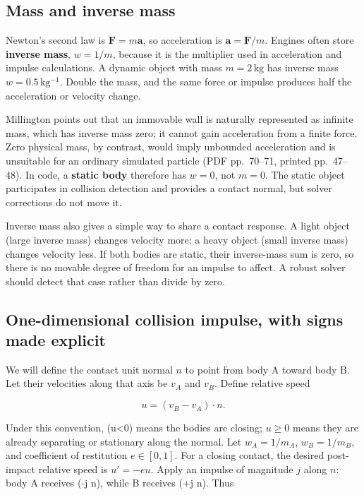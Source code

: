 \subsection{Mass and inverse mass}\label{06-engine-ii-ch033-mass-and-inverse-mass}

Newton's second law is \(\mathbf{F}=m\mathbf{a}\), so acceleration is \(\mathbf{a}=\mathbf{F}/m\). Engines often store \textbf{inverse mass}, \(w=1/m\), because it is the multiplier used in acceleration and impulse calculations. A dynamic object with mass \(m=2\,\mathrm{kg}\) has inverse mass \(w=0.5\,\mathrm{kg^{-1}}\). Double the mass, and the same force or impulse produces half the acceleration or velocity change.

Millington points out that an immovable wall is naturally represented as infinite mass, which has inverse mass zero; it cannot gain acceleration from a finite force. Zero physical mass, by contrast, would imply unbounded acceleration and is unsuitable for an ordinary simulated particle (PDF pp.~70--71, printed pp.~47--48). In code, a \textbf{static body} therefore has \(w=0\), not \(m=0\). The static object participates in collision detection and provides a contact normal, but solver corrections do not move it.

Inverse mass also gives a simple way to share a contact response. A light object (large inverse mass) changes velocity more; a heavy object (small inverse mass) changes velocity less. If both bodies are static, their inverse-mass sum is zero, so there is no movable degree of freedom for an impulse to affect. A robust solver should detect that case rather than divide by zero.

\subsection{One-dimensional collision impulse, with signs made explicit}\label{06-engine-ii-ch033-one-dimensional-collision-impulse-with-signs-made-explicit}

We will define the contact unit normal \(n\) to point from body A toward body B. Let their velocities along that axis be \(v_A\) and \(v_B\). Define relative speed

\[
u=(v_B-v_A)\cdot n.
\]

Under this convention, (u\textless0) means the bodies are closing; \(u\ge 0\) means they are already separating or stationary along the normal. Let \(w_A=1/m_A\), \(w_B=1/m_B\), and coefficient of restitution \(e\in[0,1]\). For a closing contact, the desired post-impact relative speed is \(u'=-e u\). Apply an impulse of magnitude \(j\) along \(n\): body A receives (-j n), while B receives (+j n). Thus

